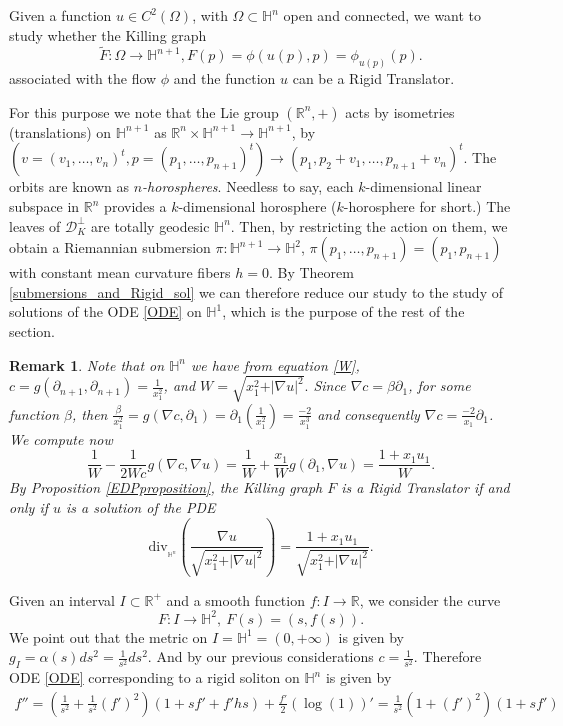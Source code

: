 \documentclass[12pt]{article}
\newtheorem{remark}[lemma]{Remark}
\numberwithin{lemma}{section}
\newcommand{\WW}{\sqrt{x_1^2+\vert \nabla u\vert^2}}
\newcommand{\R}{\mathbb{R}}
\renewcommand{\H}[1]{\mathbb{H}^{#1}}
\begin{document}
{Given a function $u\in C^2(\Omega)$, with $\Omega\subset \H{n}$ open and connected, we want to study whether the Killing graph 
\[\widetilde{F}:\Omega \rightarrow \H{n+1}, F(p)=\phi(u(p),p)=\phi_{u(p)}(p).\]
associated with the flow $\phi$ and the function $u$ can be a Rigid Translator. 

For this purpose we note that the  Lie group $(\R^{n},+)$ acts by isometries (translations) on $\mathbb{H}^{n+1}$ as $\R^{n}\times\mathbb{H}^{n+1}\rightarrow\mathbb{H}^{n+1}$, by $(v=(v_1,\ldots,v_{n})^t,p=(p_1,\ldots,p_{n+1})^t)\to (p_1,p_2+v_1,\ldots,p_{n+1}+v_{n})^t$. The orbits are known as \textit{$n$-horospheres}. Needless to say, each $k$-dimensional linear subspace in $\R^n$ provides a $k$-dimensional horosphere  ($k$-horosphere for short.) The leaves of $\mathcal{D}^{\perp}_K$ are totally geodesic $\H{n}$. Then,   by restricting the action on them, we obtain  a Riemannian submersion $\pi: \mathbb{H}^{n+1}\rightarrow \mathbb{H}^2$, $\pi(p_1,\ldots,p_{n+1})=(p_1,p_{n+1})$ with constant mean curvature fibers $h=0$. By Theorem \ref{submersions_and_Rigid_sol} we can therefore reduce our study to the study of solutions of the ODE \eqref{ODE}  on $\mathbb{H}^1$, which is the purpose of the rest of the section.
\begin{remark}
Note that on $\mathbb{H}^n$ we have from equation \eqref{W}, 
$c=g(\partial_{n+1},\partial_{n+1})=\frac{1}{x_1^2}$,  and 
$W=\sqrt{ x_1^2+\vert \nabla u\vert^2}.$
Since $\nabla c= \beta \partial_1$, for some function $\beta$, then 
$\frac{\beta}{x_1^2} = g(\nabla c,\partial_1) = \partial_1\left(\frac{1}{x_1^2}\right) = \frac{-2}{x_1^3}$
and consequently  $\nabla c= \frac{-2}{x_1}\partial_1$.
We compute now
\[\frac{1}{W}-\frac{1}{2Wc}g(\nabla c,\nabla u) = \frac1W + \frac{x_1}{W}g(\partial_1,\nabla u) = \frac{1+x_1u_1}{W}.
\]
By Proposition \ref{EDPproposition}, the Killing graph $F$ is a Rigid Translator if and only  if $u$ is a solution of the PDE
\begin{equation} \label{aleluya} 
\mathrm{div}_{_{\H{n}}}\left(\frac{\nabla u}{\WW}\right) = \frac{1+x_1u_1}{\WW}.
\end{equation}
\end{remark}
Given an interval $I\subset\R^+$ and a smooth function $f:I\rightarrow\R$, we consider the curve 
\[ F:I\rightarrow \H{2}, \ F(s)=(s,f(s)).\]
We point out that the metric on $I=\H{1}=(0,+\infty)$ is given by $g_I=\alpha(s)ds^2=\frac{1}{s^2}ds^2$.  And by our previous considerations $c=\frac{1}{s^2}$. Therefore ODE \eqref{ODE} corresponding to a rigid soliton on $\mathbb{H}^n$ is given by
\begin{eqnarray}\label{ODE_hyperbolic}
f''=(\frac{1}{s^2}+\frac{1}{s^2}(f')^2)(1+sf'+f'hs)+\frac{f'}{2}(\log(1))'=\frac{1}{s^2}(1+(f')^2)(1+sf')
\end{eqnarray}

}
\end{document}
